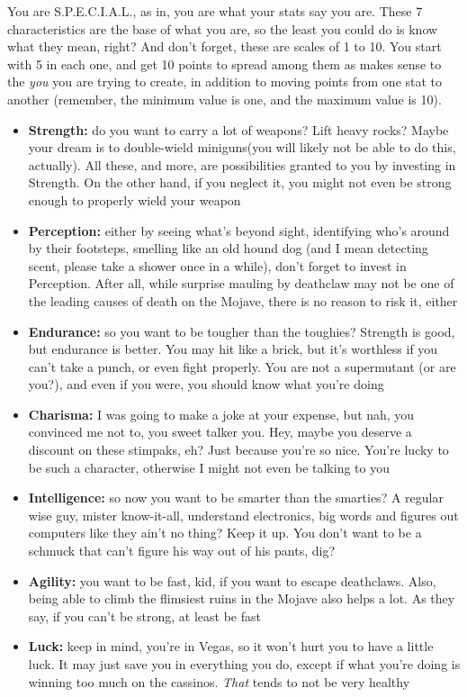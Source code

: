 \documentclass[11pt]{article} %
\begin{document}
You are S.P.E.C.I.A.L., as in, you are what your stats say you are. These 7 characteristics are the base of what you are, so the least you could do is know what they mean, right? And don't forget, these are scales of 1 to 10. You start with 5 in each one, and get 10 points to spread among them as makes sense to the \textit{you} you are trying to create, in addition to moving points from one stat to another (remember, the minimum value is one, and the maximum value is 10). 

\begin{itemize}
	\item \textbf{Strength:} do you want to carry a lot of weapons? Lift heavy rocks? Maybe your dream is to double-wield miniguns(you will likely not be able to do this, actually). All these, and more, are possibilities granted to you by investing in Strength. On the other hand, if you neglect it, you might not even be strong enough to properly wield your weapon
	
	\item \textbf{Perception:} either by seeing what's beyond sight, identifying who's around by their footsteps, smelling like an old hound dog (and I mean detecting scent, please take a shower once in a while), don't forget to invest in Perception. After all, while surprise mauling by deathclaw may not be one of the leading causes of death on the Mojave, there is no reason to risk it, either
	
	\item \textbf{Endurance:} so you want to be tougher than the toughies? Strength is good, but endurance is better. You may hit like a brick, but it's worthless if you can't take a punch, or even fight properly. You are not a supermutant (or are you?), and even if you were, you should know what you're doing
	
	\item \textbf{Charisma:} I was going to make a joke at your expense, but nah, you convinced me not to, you sweet talker you. Hey, maybe you deserve a discount on these stimpaks, eh? Just because you're so nice. You're lucky to be such a character, otherwise I might not even be talking to you
	
	\item \textbf{Intelligence:} so now you want to be smarter than the smarties? A regular wise guy, mister know-it-all, understand electronics, big words and figures out computers like they ain't no thing? Keep it up. You don't want to be a schmuck that can't figure his way out of his pants, dig?
	
	\item \textbf{Agility:} you want to be fast, kid, if you want to escape deathclaws. Also, being able to climb the flimsiest ruins in the Mojave also helps a lot. As they say, if you can't be strong, at least be fast
	
	\item \textbf{Luck:} keep in mind, you're in Vegas, so it won't hurt you to have a little luck. It may just save you in everything you do, except if what you're doing is winning too much on the cassinos. \textit{That} tends to not be very healthy
\end{itemize}
\end{document}

